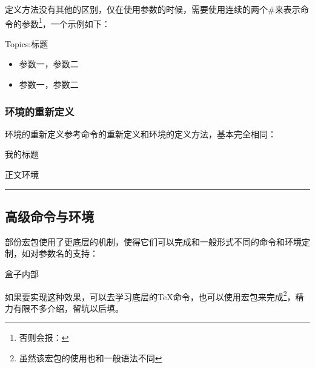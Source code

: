     定义方法没有其他的区别，仅在使用参数的时候，需要使用连续的两个\#{}来表示命令的参数\footnote{否则会报：}，一个示例如下：
    \begin{texshow}
        \newenvironment{topics}[1]
        {
            \newcommand{\topic}[2]{ \item{##1，##2} }
            Topics:#1
            \begin{itemize}
        }
        {\end{itemize}}
        \begin{topics}{标题}
            \topic{参数一}{参数二}
            \topic{参数一}{参数二}
        \end{topics}
    \end{texshow}

    \subsubsection{环境的重新定义}
    环境的重新定义参考命令的重新定义和环境的定义方法，基本完全相同：

    \newenvironment{titleenv}{\begin{center}居中标题\end{center}}{\\\rule{\textwidth}{1mm}}
    \begin{texshow}
        \renewenvironment{titleenv}[1][居中标题]{
            \begin{center}#1\end{center}
        }{\\\rule{\textwidth}{1mm}}
        
        \begin{titleenv}[我的标题]
            正文环境
        \end{titleenv}
    \end{texshow}

    \subsection{高级命令与环境}
    部份宏包使用了更底层的机制，使得它们可以完成和一般形式不同的命令和环境定制，如对参数名的支持：
    \begin{texshow}
        \begin{tcolorbox}[colframe=blue!50!,colback=blue!20!]
            盒子内部
        \end{tcolorbox}
    \end{texshow}
    如果要实现这种效果，可以去学习底层的TeX命令，也可以使用宏包来完成\footnote{虽然该宏包的使用也和一般语法不同}，精力有限不多介绍，留坑以后填。

